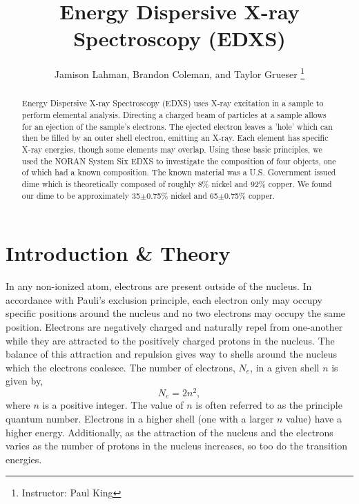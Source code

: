 \documentclass[10pt]{IEEEtran}
\begin{document}
    \title{Energy Dispersive X-ray Spectroscopy (EDXS)}
    \author{Jamison Lahman, Brandon Coleman, and Taylor Grueser
    \thanks{Instructor: Paul King}}
    \maketitle

\begin{abstract}
Energy Dispersive X-ray Spectroscopy (EDXS) uses X-ray excitation in a sample to perform elemental analysis. Directing a charged beam of particles at a sample allows for an ejection of the sample's electrons. The ejected electron leaves a 'hole' which can then be filled by an outer shell electron, emitting an X-ray. Each element has specific X-ray energies, though some elements may overlap. Using these basic principles, we used the NORAN System Six EDXS to investigate the composition of four objects, one of which had a known composition. The known material was a U.S. Government issued dime which is theoretically composed of roughly 8\% nickel and 92\% copper. We found our dime to be approximately 35$\pm$0.75\% nickel and 65$\pm$0.75\% copper.
\end{abstract}

\section{Introduction \& Theory}
In any non-ionized atom, electrons are present outside of the nucleus. In accordance with Pauli's exclusion principle, each electron only may occupy specific positions around the nucleus and no two electrons may occupy the same position. Electrons are negatively charged and naturally repel from one-another while they are attracted to the positively charged protons in the nucleus. The balance of this attraction and repulsion gives way to shells around the nucleus which the electrons coalesce. The number of electrons, $N_e$, in a given shell $n$ is given by,
\begin{equation}
N_e = 2n^{2},
\label{eq.1}
\end{equation}
where $n$ is a positive integer. The value of $n$ is often referred to as the principle quantum number\cite{michler}. Electrons in a higher shell (one with a larger $n$ value) have a higher energy. Additionally, as the attraction of the nucleus and the electrons varies as the number of protons in the nucleus increases, so too do the transition energies.
\end{document}
